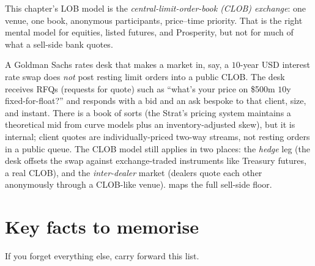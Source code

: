 This chapter's LOB model is the \emph{central-limit-order-book (CLOB)
exchange}: one venue, one book, anonymous participants, price--time
priority. That is the right mental model for equities, listed
futures, and Prosperity, but not for much of what a sell-side bank
quotes.

\begin{gsbox}
A Goldman Sachs rates desk that makes a market in, say, a $10$-year
USD interest rate swap does \emph{not} post resting limit orders into
a public CLOB. The desk receives RFQs (requests for quote) such as
``what's your price on \$500m $10$y fixed-for-float?'' and
responds with a bid and an ask bespoke to that client, size, and
instant. There is a book of sorts (the Strat's pricing system
maintains a theoretical mid from curve models plus an
inventory-adjusted skew), but it is internal; client quotes are
individually-priced two-way streams, not resting orders in a public
queue. The CLOB model still applies in two places: the \emph{hedge}
leg (the desk offsets the swap against exchange-traded instruments
like Treasury futures, a real CLOB), and the \emph{inter-dealer}
market (dealers quote each other anonymously through a CLOB-like
venue).  maps the full sell-side floor.
\end{gsbox}

\section{Key facts to memorise}
\label{sec:ch1_key_facts}

If you forget everything else, carry forward this list.

